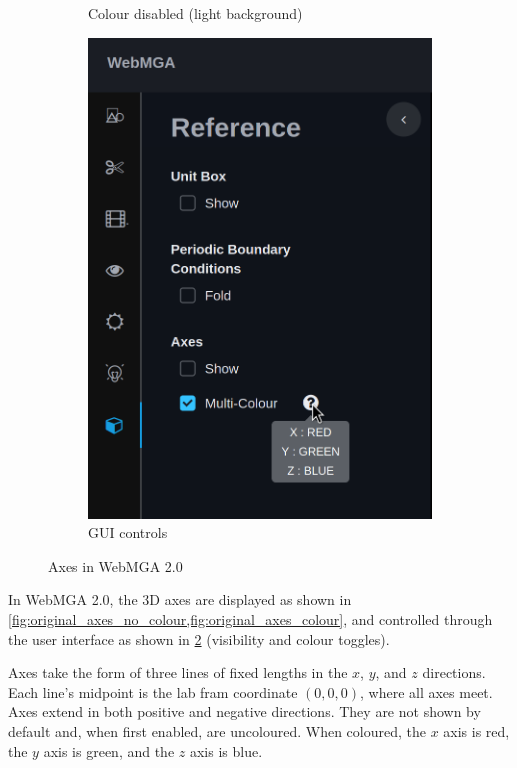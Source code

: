 \begin{figure}
\begin{center}
\begin{subfigure}{0.4\textwidth}
      \caption{Colour disabled (light background)}
      \label{fig:original_axes_no_colour_bad}
    \end{subfigure}
    \begin{subfigure}{0.4\textwidth}
      \includegraphics[width=\linewidth]{assets/images/axes/2_gui}
      \caption{GUI controls}
      \label{fig:original_axes_controls}
    \end{subfigure} 
  \end{center}
  \caption{Axes in WebMGA 2.0}
  \label{fig:original_axes}
\end{figure}

In WebMGA 2.0, the 3D axes are displayed as shown in \cref{fig:original_axes_no_colour,fig:original_axes_colour}, and controlled through the user interface as shown in \cref{fig:original_axes_controls} (visibility and colour toggles).

Axes take the form of three lines of fixed lengths in the $x$, $y$, and $z$ directions. Each line's midpoint is the lab fram coordinate $(0, 0, 0)$, where all axes meet. Axes extend in both positive and negative directions. They are not shown by default and, when first enabled, are uncoloured. When coloured, the $x$ axis is red, the $y$ axis is green, and the $z$ axis is blue.

